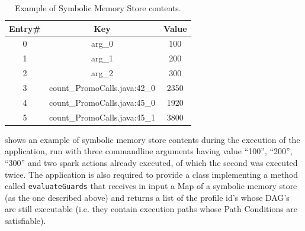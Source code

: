 \begin{table}[tbhp]
	\centering
	\caption{Example of Symbolic Memory Store contents.}
	\label{Table:impl_symbolic_memory_store_contents}
	\begin{tabular}{|c|c|c|}
		\hline
		\textbf{Entry\#} & \textbf{Key} & \textbf{Value} \\ \hline
		0	& arg\_0						&  100      \\ \hline
		1	& arg\_1						&  200      \\ \hline
		2	& arg\_2						&  300      \\ \hline
		3	& count\_PromoCalls.java:42\_0	& 2350      \\ \hline
		4	& count\_PromoCalls.java:45\_0	& 1920      \\ \hline
		5	& count\_PromoCalls.java:45\_1	& 3800      \\ \hline
	\end{tabular}
\end{table}
 shows an example of symbolic memory store contents during the execution of the application, run with three commandline arguments having value “100”, “200”, “300” and two spark actions already executed, of which the second was executed twice.
The application is also required to provide a class implementing a method called \texttt{evaluateGuards} that receives in input a Map of a symbolic memory store (as the one described above) and returns a list of the profile id’s whose DAG’s are still executable (i.e. they contain execution paths whose Path Conditions are satisfiable).

